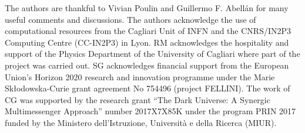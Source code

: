 \documentclass[a4paper,11pt]{article}
\begin{document}
\acknowledgments
The authors are thankful to Vivian Poulin and Guillermo F. Abell\'an for many useful comments and discussions. The authors acknowledge the use of computational resources from the Cagliari Unit of INFN and the CNRS/IN2P3 Computing Centre (CC-IN2P3) in Lyon. RM acknowledges the hospitality and support of the Physics Department of the University of Cagliari where part of the project was carried out.
SG acknowledges financial support from the European Union's Horizon 2020 research and innovation programme under the Marie Skłodowska-Curie grant agreement No 754496 (project FELLINI).
The work of CG was supported by the research grant ``The Dark Universe: A Synergic Multimessenger Approach'' number 2017X7X85K under the program PRIN 2017 funded by the Ministero dell'Istruzione, Universit\`a e della Ricerca (MIUR).






\begin{table}[h]
\centering
{}
\caption{Best-fit $\chi^2$ per experiment (and total) from our CMB analyses in the $\Lambda$CDM model.}
\label{tab:chi2_LCDM_CMB}
\end{table}
\end{document}
